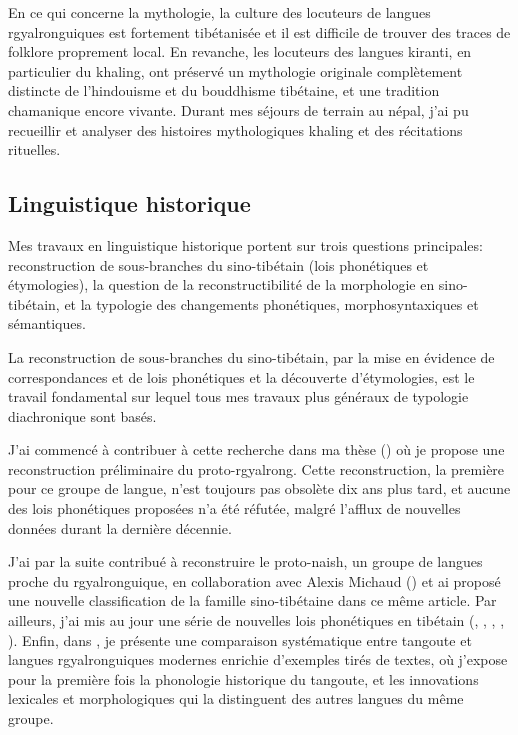\documentclass[oldfontcommands,oneside,a4paper,11pt]{article}
\begin{document}
En ce qui concerne la mythologie,    la culture des locuteurs de langues rgyalronguiques est fortement tibétanisée et il est difficile de trouver des traces de folklore proprement local. En revanche, les locuteurs des langues kiranti, en particulier du khaling, ont préservé un mythologie originale complètement distincte de l'hindouisme et du bouddhisme tibétaine, et une tradition chamanique encore vivante. Durant mes séjours de terrain au népal, j'ai pu recueillir et analyser des histoires mythologiques khaling et des récitations rituelles.

\subsection{Linguistique historique}  \label{sec:diachronie}
Mes travaux en linguistique historique portent sur trois questions principales: reconstruction de sous-branches du sino-tibétain (lois phonétiques et étymologies), la question de la reconstructibilité de la morphologie en sino-tibétain, et la typologie des changements phonétiques, morphosyntaxiques et sémantiques.
 
La reconstruction de sous-branches du sino-tibétain, par la mise en évidence de correspondances et de lois phonétiques et la découverte d'étymologies, est le travail fondamental sur lequel tous mes travaux plus généraux de typologie diachronique sont basés. 

J'ai commencé à contribuer à cette recherche dans ma thèse (\citealt{jacques04these}) où je propose une reconstruction préliminaire du proto-rgyalrong. Cette reconstruction, la première pour ce groupe de langue,   n'est toujours pas obsolète dix ans plus tard, et aucune des lois phonétiques proposées n'a été réfutée, malgré l'afflux de nouvelles données durant la dernière décennie. 

J'ai par la suite contribué à reconstruire le proto-naish, un groupe de langues proche du rgyalronguique, en collaboration avec Alexis Michaud (\citealt{jacques.michaud11naish}) et ai proposé une nouvelle classification de la famille sino-tibétaine dans ce même article. Par ailleurs, j'ai  mis au jour une série de nouvelles lois phonétiques en tibétain (\citealt{jacques09wazur},   \citealt{jacques09e},  \citealt{jacques12internal},   \citealt{jacques13yod}, \citealt{jacques14snom}). Enfin, dans  \citet{jacques14esquisse}, je présente une comparaison systématique entre tangoute et langues rgyalronguiques modernes enrichie d'exemples tirés de textes, où j'expose pour la première fois la phonologie historique du tangoute, et les innovations lexicales et morphologiques qui la distinguent des autres langues du même groupe.
\end{document}
